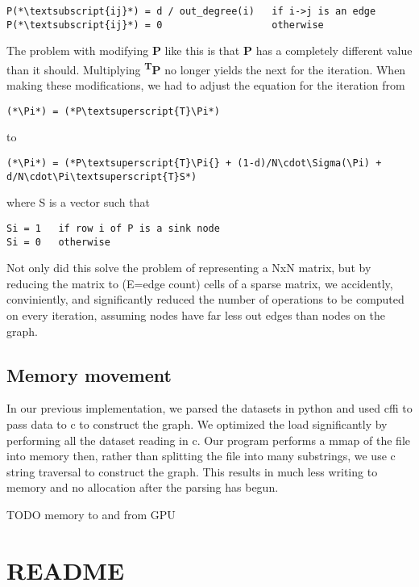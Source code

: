 \documentclass[draft]{report}
\begin{document}
\begin{lstlisting}
P(*\textsubscript{ij}*) = d / out_degree(i)   if i->j is an edge
P(*\textsubscript{ij}*) = 0                   otherwise
\end{lstlisting}

The problem with modifying \textbf{P} like this is that \textbf{P} has a completely different value than it should. Multiplying \textbf{\Pi\textsuperscript{T}P} no longer yields the next \Pi{} for the iteration. When making these modifications, we had to adjust the equation for the iteration from

\begin{lstlisting}
(*\Pi*) = (*P\textsuperscript{T}\Pi*)
\end{lstlisting}

to

\begin{lstlisting}
(*\Pi*) = (*P\textsuperscript{T}\Pi{} + (1-d)/N\cdot\Sigma(\Pi) + d/N\cdot\Pi\textsuperscript{T}S*)
\end{lstlisting}

where S is a vector such that

\begin{lstlisting}
Si = 1   if row i of P is a sink node
Si = 0   otherwise
\end{lstlisting}

Not only did this solve the problem of representing a NxN matrix, but by reducing the matrix to (E=edge count) cells of a sparse matrix, we accidently, conviniently, and significantly reduced the number of operations to be computed on every iteration, assuming nodes have far less out edges than nodes on the graph.

\subsection{Memory movement}
In our previous implementation, we parsed the datasets in python and used cffi to pass data to c to construct the graph. We optimized the load significantly by performing all the dataset reading in c. Our program performs a mmap of the file into memory then, rather than splitting the file into many substrings, we use c string traversal to construct the graph. This results in much less writing to memory and no allocation after the parsing has begun.

TODO memory to and from GPU

\appendix

\section{README}
\end{document}
